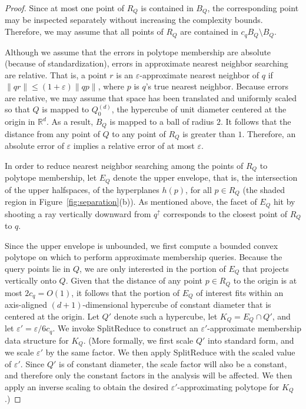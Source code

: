 \documentclass[11pt]{article}   \usepackage[letterpaper,hmargin=2.1cm,vmargin=3cm]{geometry}
\newcommand{\RE}{\mathbb{R}}    \newcommand{\ZZ}{\mathbb{Z}}    \newcommand{\eps}{\varepsilon}  \newcommand{\ST}{\,:\,}         \newcommand{\sq}{\square}
\newcommand{\alg}{\textrm{SplitReduce}}
\begin{document}
\begin{proof}
Since at most one point of $R_Q$ is contained in $B_Q$, the corresponding point may be inspected separately without increasing the complexity bounds. Therefore, we may assume that all points of $R_Q$ are contained in $c_q B_Q \setminus B_Q$. 

Although we assume that the errors in polytope membership are absolute (because of standardization), errors in approximate nearest neighbor searching are relative. That is, a point $r$ is an $\eps$-approximate nearest neighbor of $q$ if $\|q r\| \le (1+\eps) \|q p\|$, where $p$ is $q$'s true nearest neighbor. Because errors are relative, we may assume that space has been translated and uniformly scaled so that $Q$ is mapped to $Q_0^{(d)}$, the hypercube of unit diameter centered at the origin in $\RE^d$. As a result, $B_Q$ is mapped to a ball of radius $2$. It follows that the distance from any point of $Q$ to any point of $R_Q$ is greater than $1$. Therefore, an absolute error of $\eps$ implies a relative error of at most $\eps$.

In order to reduce nearest neighbor searching among the points of $R_Q$ to polytope membership, let $E_Q$ denote the upper envelope, that is, the intersection of the upper halfspaces, of the hyperplanes $h(p)$, for all $p \in R_Q$ (the shaded region in Figure~\ref{fig:separation}(b)). As mentioned above, the facet of $E_Q$ hit by shooting a ray vertically downward from $q^{\uparrow}$ corresponds to the closest point of $R_Q$ to $q$. 

Since the upper envelope is unbounded, we first compute a bounded convex polytope on which to perform approximate membership queries. Because the query points lie in $Q$, we are only interested in the portion of $E_Q$ that projects vertically onto $Q$. Given that the distance of any point $p \in R_Q$ to the origin is at most $2 c_q = O(1)$, it follows that the portion of $E_Q$ of interest fits within an axis-aligned $(d+1)$-dimensional hypercube of constant diameter that is centered at the origin. Let $Q'$ denote such a hypercube, let $K_Q = E_Q \cap Q'$, and let $\eps' = \eps/6 c_q$. We invoke {\alg} to construct an $\eps'$-approximate membership data structure for $K_Q$. (More formally, we first scale $Q'$ into standard form, and we scale $\eps'$ by the same factor. We then apply {\alg} with the scaled value of $\eps'$. Since $Q'$ is of constant diameter, the scale factor will also be a constant, and therefore only the constant factors in the analysis will be affected. We then apply an inverse scaling to obtain the desired $\eps'$-approximating polytope for $K_Q$.)


\end{proof}
\end{document}
